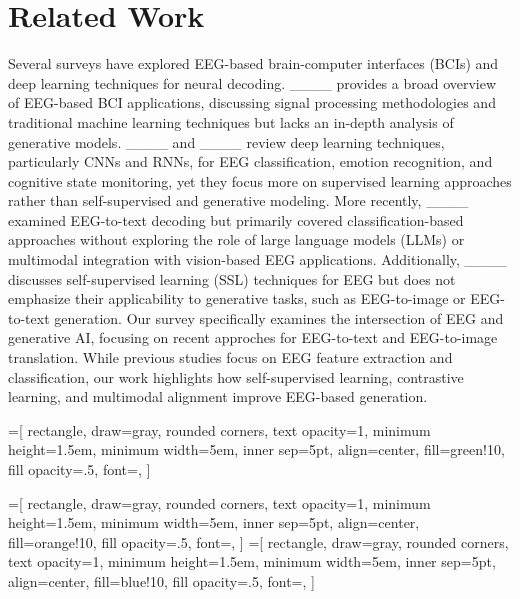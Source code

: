 \section{Related Work}
\label{sec:relwork}

Several surveys have explored EEG-based brain-computer interfaces (BCIs) and deep learning techniques for neural decoding. ____ provides a broad overview of EEG-based BCI applications, discussing signal processing methodologies and traditional machine learning techniques but lacks an in-depth analysis of generative models. ____ and ____ review deep learning techniques, particularly CNNs and RNNs, for EEG classification, emotion recognition, and cognitive state monitoring, yet they focus more on supervised learning approaches rather than self-supervised and generative modeling. More recently, ____ examined EEG-to-text decoding but primarily covered classification-based approaches without exploring the role of large language models (LLMs) or multimodal integration with vision-based EEG applications. Additionally, ____ discusses self-supervised learning (SSL) techniques for EEG but does not emphasize their applicability to generative tasks, such as EEG-to-image or EEG-to-text generation. Our survey specifically examines the intersection of EEG and generative AI, focusing on recent approches for EEG-to-text and EEG-to-image translation. While previous studies focus on EEG feature extraction and classification, our work highlights how self-supervised learning, contrastive learning, and multimodal alignment improve EEG-based generation.




=[
    rectangle,
    draw=gray,
    rounded corners,
    text opacity=1,
    minimum height=1.5em,
    minimum width=5em,
    inner sep=5pt,
    align=center,
    fill=green!10,
    fill opacity=.5,
    font=\small,
]

=[
    rectangle,
    draw=gray,
    rounded corners,
    text opacity=1,
    minimum height=1.5em,
    minimum width=5em,
    inner sep=5pt,
    align=center,
    fill=orange!10,
    fill opacity=.5,
    font=\small,
]
=[
    rectangle,
    draw=gray,
    rounded corners,
    text opacity=1,
    minimum height=1.5em,
    minimum width=5em,
    inner sep=5pt,
    align=center,
    fill=blue!10,
    fill opacity=.5,
    font=\small,
]
    
